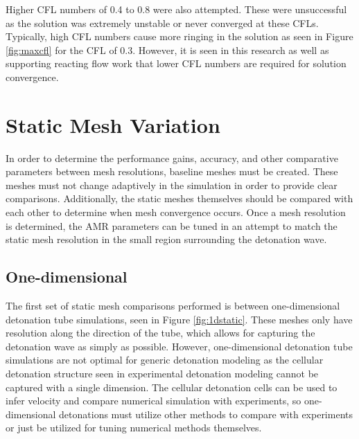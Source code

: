 Higher CFL numbers of 0.4 to 0.8 were also attempted. These were unsuccessful as the solution was extremely unstable or never converged at these CFLs. Typically, high CFL numbers cause more ringing in the solution as seen in Figure \ref{fig:maxcfl} for the CFL of 0.3. However, it is seen in this research as well as supporting reacting flow work \cite{ajaero,kim,marcantoni} that lower CFL numbers are required for solution convergence. 

\section{Static Mesh Variation}
\label{sec:staticvar}
In order to determine the performance gains, accuracy, and other comparative parameters between mesh resolutions, baseline meshes must be created. These meshes must not change adaptively in the simulation in order to provide clear comparisons. Additionally, the static meshes themselves should be compared with each other to determine when mesh convergence occurs. Once a mesh resolution is determined, the AMR parameters can be tuned in an attempt to match the static mesh resolution in the small region surrounding the detonation wave. 


\subsection{One-dimensional}
\label{sec:1dstatic}

The first set of static mesh comparisons performed is between one-dimensional detonation tube simulations, seen in Figure \ref{fig:1dstatic}. These meshes only have resolution along the direction of the tube, which allows for capturing the detonation wave as simply as possible. However,  one-dimensional detonation tube simulations are not optimal for generic detonation modeling as the cellular detonation structure seen in experimental detonation modeling cannot be captured with a single dimension. The cellular detonation cells can be used to infer velocity and compare numerical simulation with experiments, so one-dimensional detonations must utilize other methods to compare with experiments or just be utilized for tuning numerical methods themselves. 

